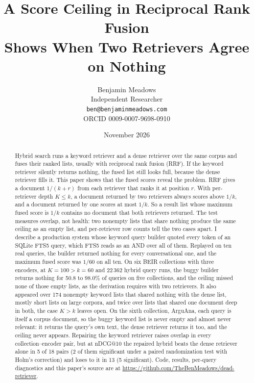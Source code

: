 \documentclass[11pt]{article}
\title{A Score Ceiling in Reciprocal Rank Fusion\\Shows When Two Retrievers Agree on Nothing}
\author{Benjamin Meadows\\Independent Researcher\\\texttt{ben@benjaminmeadows.com}\\ORCID 0009-0007-9698-0910}
\date{November 2026}
\begin{document}
\maketitle

\begin{abstract}
Hybrid search runs a keyword retriever and a dense retriever over the same corpus and fuses their ranked lists, usually with reciprocal rank fusion (RRF). If the keyword retriever silently returns nothing, the fused list still looks full, because the dense retriever fills it. This paper shows that the fused scores reveal the problem. RRF gives a document $1/(k+r)$ from each retriever that ranks it at position $r$. With per-retriever depth $K \le k$, a document returned by two retrievers always scores above $1/k$, and a document returned by one scores at most $1/k$. So a result list whose maximum fused score is $1/k$ contains no document that both retrievers returned. The test measures overlap, not health: two nonempty lists that share nothing produce the same ceiling as an empty list, and per-retriever row counts tell the two cases apart. I describe a production system whose keyword query builder quoted every token of an SQLite FTS5 query, which FTS5 reads as an AND over all of them. Replayed on ten real queries, the builder returned nothing for every conversational one, and the maximum fused score was $1/60$ on all ten. On six BEIR collections with three encoders, at $K = 100 > k = 60$ and 22\,362 hybrid query runs, the buggy builder returns nothing for 50.8 to 98.0\% of queries on five collections, and the ceiling missed none of those empty lists, as the derivation requires with two retrievers. It also appeared over 174 nonempty keyword lists that shared nothing with the dense list, mostly short lists on large corpora, and twice over lists that shared one document deep in both, the case $K > k$ leaves open. On the sixth collection, ArguAna, each query is itself a corpus document, so the buggy keyword list is never empty and almost never relevant: it returns the query's own text, the dense retriever returns it too, and the ceiling never appears. Repairing the keyword retriever raises overlap in every collection--encoder pair, but at nDCG@10 the repaired hybrid beats the dense retriever alone in 5 of 18 pairs (2 of them significant under a paired randomization test with Holm's correction) and loses to it in 13 (5 significant). Code, results, per-query diagnostics and this paper's source are at \url{https://github.com/TheBenMeadows/dead-retriever}.
\end{abstract}
\end{document}
